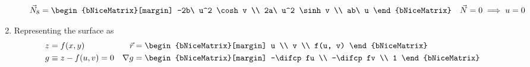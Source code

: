\begin{enumerate}
\begin{enumerate}
                    \begin{align}
                        \vec{N}_8                   & =
                        \begin{bNiceMatrix}[margin]
                            -2b\ u^2 \cosh v \\
                            2a\ u^2 \sinh v  \\
                            ab\ u
                        \end{bNiceMatrix} &
                        \vec{N} = 0                 &
                        \implies u = 0
                    \end{align}
          \end{enumerate}

    \item Representing the surface as
          \begin{align}
              z        & = f(x, y)                     &
              \vec{r}  & = \begin{bNiceMatrix}[margin]
                               u \\ v \\ f(u, v)
                           \end{bNiceMatrix}    \\
              g        & \equiv z - f(u, v) = 0        &
              \nabla g & = \begin{bNiceMatrix}[margin]
                               -\difcp fu \\ -\difcp fv \\ 1
                           \end{bNiceMatrix}
          \end{align}


\end{enumerate}
